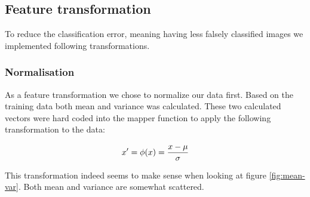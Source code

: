 \documentclass[a4paper, 11pt]{article}
\begin{document}
\subsection{Feature transformation}

To reduce the classification error, meaning having less falsely classified
images we implemented following transformations.

\subsubsection{Normalisation}


As a feature transformation we chose to normalize our data first. Based on the
training data both mean and variance was calculated. These two calculated
vectors were hard coded into the mapper function to apply the following
transformation to the data:

$$ x' = \phi(x) = { {x - \mu} \over \sigma} $$ 

This transformation indeed seems to make sense when looking at figure
\ref{fig:mean-var}. Both mean and variance are somewhat scattered.
\end{document}
